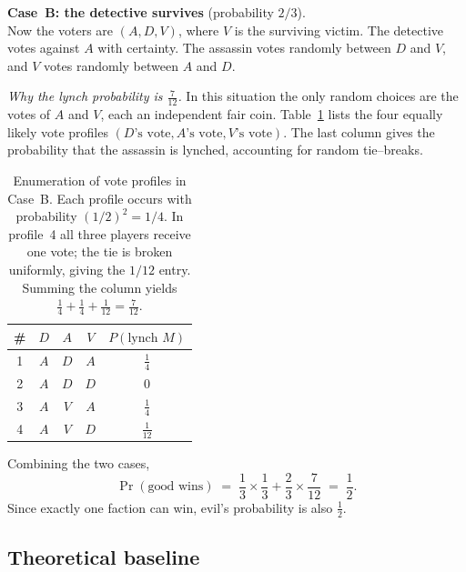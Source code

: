 \documentclass{article}
\begin{document}
\smallskip
\noindent\textbf{Case~B: the detective survives} (probability $2/3$).\\
Now the voters are $(A,D,V)$, where $V$ is the surviving victim.  The detective votes against $A$ with certainty.  The assassin votes randomly between $D$ and $V$, and $V$ votes randomly between $A$ and $D$.

\medskip
\emph{Why the lynch probability is $\tfrac{7}{12}$.}  In this situation the only random choices are the votes of $A$ and $V$, each an independent fair coin.  Table~\ref{tab:caseB} lists the four equally likely vote profiles $(D\text{'s vote},A\text{'s vote},V\text{'s vote})$.  The last column gives the probability that the assassin is lynched, accounting for random tie--breaks.
\begin{table}[h]
\centering
\begin{tabular}{c|ccc|c}
\toprule
\# & $D$ & $A$ & $V$ & $P(\text{lynch }M)$ \\
\midrule
1 & $A$ & $D$ & $A$ & $\tfrac14$ \\
2 & $A$ & $D$ & $D$ & $0$ \\
3 & $A$ & $V$ & $A$ & $\tfrac14$ \\
4 & $A$ & $V$ & $D$ & $\tfrac1{12}$ \\
\bottomrule
\end{tabular}
\caption{Enumeration of vote profiles in Case~B.  Each profile occurs with probability $(1/2)^2=1/4$.  In profile~4 all three players receive one vote; the tie is broken uniformly, giving the $1/12$ entry.  Summing the column yields $\tfrac14+\tfrac14+\tfrac1{12}=\tfrac{7}{12}$.}
\label{tab:caseB}
\end{table}

\noindent Combining the two cases,
\[
\Pr(\text{good wins}) \;=\; \frac13\!\times\!\frac13 + \frac23\!\times\!\frac{7}{12} \;=\; \frac12 .
\]
Since exactly one faction can win, evil's probability is also $\tfrac12$.


\subsection{Theoretical baseline}
\end{document}
